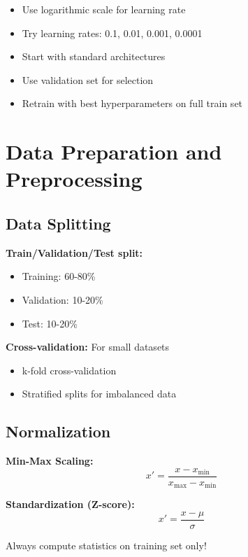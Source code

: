 \begin{itemize}
    \item Use logarithmic scale for learning rate
    \item Try learning rates: 0.1, 0.01, 0.001, 0.0001
    \item Start with standard architectures
    \item Use validation set for selection
    \item Retrain with best hyperparameters on full train set
\end{itemize}

\section{Data Preparation and Preprocessing}
\label{sec:data-preparation}

\subsection{Data Splitting}

\textbf{Train/Validation/Test split:}
\begin{itemize}
    \item Training: 60-80\%
    \item Validation: 10-20\%
    \item Test: 10-20\%
\end{itemize}

\textbf{Cross-validation:} For small datasets
\begin{itemize}
    \item k-fold cross-validation
    \item Stratified splits for imbalanced data
\end{itemize}

\subsection{Normalization}

\textbf{Min-Max Scaling:}
\begin{equation}
x' = \frac{x - x_{\min}}{x_{\max} - x_{\min}}
\end{equation}

\textbf{Standardization (Z-score):}
\begin{equation}
x' = \frac{x - \mu}{\sigma}
\end{equation}

Always compute statistics on training set only!

